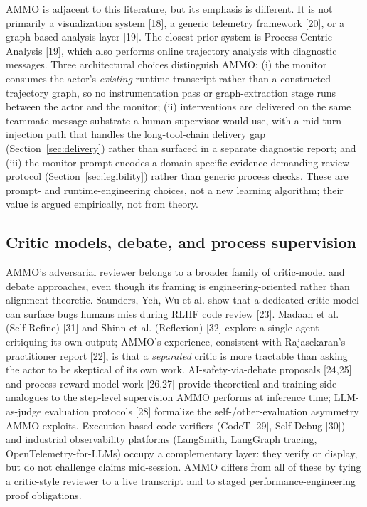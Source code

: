 \documentclass[11pt]{article}
\begin{document}
AMMO is adjacent to this literature, but its emphasis is different. It is not primarily a visualization system [18], a generic telemetry framework [20], or a graph-based analysis layer [19]. The closest prior system is Process-Centric Analysis [19], which also performs online trajectory analysis with diagnostic messages. Three architectural choices distinguish AMMO: (i) the monitor consumes the actor's \emph{existing} runtime transcript rather than a constructed trajectory graph, so no instrumentation pass or graph-extraction stage runs between the actor and the monitor; (ii) interventions are delivered on the same teammate-message substrate a human supervisor would use, with a mid-turn injection path that handles the long-tool-chain delivery gap (Section~\ref{sec:delivery}) rather than surfaced in a separate diagnostic report; and (iii) the monitor prompt encodes a domain-specific evidence-demanding review protocol (Section~\ref{sec:legibility}) rather than generic process checks. These are prompt- and runtime-engineering choices, not a new learning algorithm; their value is argued empirically, not from theory.

\subsection{Critic models, debate, and process supervision}
\label{sec:critic-related}

AMMO's adversarial reviewer belongs to a broader family of critic-model and debate approaches, even though its framing is engineering-oriented rather than alignment-theoretic. Saunders, Yeh, Wu et al. show that a dedicated critic model can surface bugs humans miss during RLHF code review [23]. Madaan et al. (Self-Refine) [31] and Shinn et al. (Reflexion) [32] explore a single agent critiquing its own output; AMMO's experience, consistent with Rajasekaran's practitioner report [22], is that a \emph{separated} critic is more tractable than asking the actor to be skeptical of its own work. AI-safety-via-debate proposals [24,25] and process-reward-model work [26,27] provide theoretical and training-side analogues to the step-level supervision AMMO performs at inference time; LLM-as-judge evaluation protocols [28] formalize the self-/other-evaluation asymmetry AMMO exploits. Execution-based code verifiers (CodeT [29], Self-Debug [30]) and industrial observability platforms (LangSmith, LangGraph tracing, OpenTelemetry-for-LLMs) occupy a complementary layer: they verify or display, but do not challenge claims mid-session. AMMO differs from all of these by tying a critic-style reviewer to a live transcript and to staged performance-engineering proof obligations.
\end{document}
